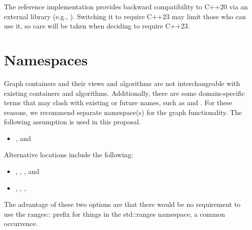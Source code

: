 The reference implementation provides backward compatibility to C++20 via an external  library 
(e.g., ). Switching it to require C++23 may limit those who can use it, so care will be
taken when deciding to require C++23.

\section{Namespaces}
Graph containers and their views and algorithms are not interchangeable with existing containers and algorithms.
Additionally, there are some domain-specific terms that may clash with existing or future names, such as 
 and .
For these reasons, we recommend separate namespace(s) for the graph functionality. The following assumption is used in this proposal.
\begin{itemize}
\item[],  and 
\end{itemize}

\noindent
Alternative locations include the following:
\begin{itemize}
\item[], , , and 
\item[], , , 
\end{itemize}
The advantage of these two options are that there would be no requirement to use the ranges:: prefix for things
in the std::ranges namespace, a common occurrence.

